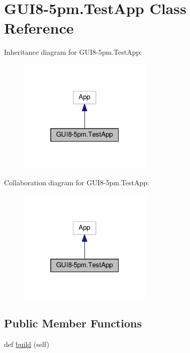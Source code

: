 \hypertarget{classGUI8-5pm_1_1TestApp}{}\section{G\+U\+I8-\/5pm.Test\+App Class Reference}
\label{classGUI8-5pm_1_1TestApp}


Inheritance diagram for G\+U\+I8-\/5pm.Test\+App\+:
\nopagebreak
\begin{figure}[H]
\begin{center}
\leavevmode
\includegraphics[width=181pt]{classGUI8-5pm_1_1TestApp__inherit__graph}
\end{center}
\end{figure}


Collaboration diagram for G\+U\+I8-\/5pm.Test\+App\+:
\nopagebreak
\begin{figure}[H]
\begin{center}
\leavevmode
\includegraphics[width=181pt]{classGUI8-5pm_1_1TestApp__coll__graph}
\end{center}
\end{figure}
\subsection*{Public Member Functions}
\begin{DoxyCompactItemize}
\item 
def \hyperlink{classGUI8-5pm_1_1TestApp_af577f679db75d0915d6dc2a9bd312852}{build} (self)
\end{DoxyCompactItemize}
